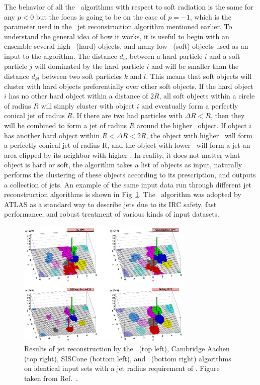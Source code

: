 The behavior of all the \kt\ algorithms with respect to soft radiation is the same for any $p < 0$ but the focus is going to be on the case of $p = -1$, which is the parameter used in the \antikt\ jet reconstruction algorithm mentioned earlier. To understand the general idea of how it works, it is useful to begin with an ensemble several high \pt\ (hard) objects, and many low \pt\ (soft) objects used as an input to the algorithm. The distance $d_{ij}$ between a hard particle $i$ and a soft particle $j$ will dominated by the hard particle $i$ and will be smaller than the distance $d_{kl}$ between two soft particles $k$ and $l$. This means that soft objects will cluster with hard objects preferentially over other soft objects. If the hard object $i$ has no other hard object within a distance of $2R$, all soft objects within a circle of radius $R$ will simply cluster with object $i$ and eventually form a perfectly conical jet of radius $R$. If there are two had particles with $\Delta R < R$, then they will be combined to form a jet of radius $R$ around the higher \pt\ object. If object $i$ has another hard object within $R < \Delta R < 2R$, the object with higher \pt\ will form a perfectly conical jet of radius R, and the object with lower \pt\ will form a jet an area clipped by its neighbor with higher \pt. In reality, it does not matter what object is hard or soft, the algorithm takes a list of objects as input, naturally performs the clustering of these objects according to its prescription, and outputs a collection of jets. An example of the same input data run through different jet reconstruction algorithms is shown in Fig~\ref{fig:jetalgos}. The \antikt\ algorithm was adopted by ATLAS as a standard way to describe jets due to its IRC safety, fast performance, and robust treatment of various kinds of input datasets. 

\begin{figure}
	\centering
	\includegraphics[width=0.75\textwidth]{figures/jetalgo.pdf} 
	\caption{ Results of jet reconstruction by the \kt\ (top left), Cambridge Aachen (top right), SISCone (bottom left), and \antikt\ (bottom right) algorithms on identical input sets with a jet radius requirement of \ROne. Figure taken from Ref.~\cite{Cacciari:2008gp}.}
	\label{fig:jetalgos}
\end{figure}

